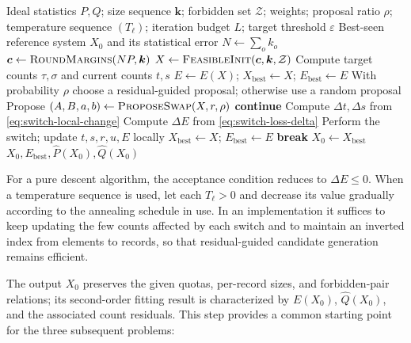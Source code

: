 \documentclass[11pt,a4paper]{article}
\numberwithin{equation}{section}
\theoremstyle{definition}
\numberwithin{algorithm}{section}
\begin{document}
\begin{algorithm}[H]
\small
\caption{Feasible initialization and residual-guided second-order statistical fitting}
\label{alg:baseline}
\begin{algorithmic}[1]
\Require Ideal statistics $P,Q$; size sequence $\boldsymbol k$;
forbidden set $\mathcal Z$; weights; proposal ratio $\rho$;
temperature sequence $(T_\ell)$; iteration budget $L$; target threshold $\varepsilon$
\Ensure Best-seen reference system $X_0$ and its statistical error
\State $N\gets\sum_o k_o$
\State $\boldsymbol c\gets\Call{RoundMargins}{NP,\boldsymbol k}$
\State $X\gets\Call{FeasibleInit}{\boldsymbol c,\boldsymbol k,\mathcal Z}$
\State Compute target counts $\tau,\sigma$ and current counts $t,s$
\State $E\gets E(X)$; $X_{\mathrm{best}}\gets X$;
       $E_{\mathrm{best}}\gets E$
  \State With probability $\rho$ choose a residual-guided proposal; otherwise use a random proposal
  \State Propose $(A,B,a,b)\gets\Call{ProposeSwap}{X,r,\rho}$
    \State \textbf{continue}
  \EndIf
  \State Compute $\Delta t,\Delta s$ from \eqref{eq:switch-local-change}
  \State Compute $\Delta E$ from \eqref{eq:switch-loss-delta}
    \State Perform the switch; update $t,s,r,u,E$ locally
      \State $X_{\mathrm{best}}\gets X$;
             $E_{\mathrm{best}}\gets E$
    \EndIf
  \EndIf
    \State \textbf{break}
  \EndIf
\EndFor
\State $X_0\gets X_{\mathrm{best}}$
\State \Return $X_0,E_{\mathrm{best}},\widehat P(X_0),\widehat Q(X_0)$
\end{algorithmic}
\end{algorithm}

For a pure descent algorithm, the acceptance condition reduces to $\Delta E\le0$.
When a temperature sequence is used, let each $T_\ell>0$ and decrease its value gradually
according to the annealing schedule in use.
In an implementation it suffices to keep updating the few counts affected by each switch and
to maintain an inverted index from elements to records, so that residual-guided candidate
generation remains efficient.

The output $X_0$ preserves the given quotas, per-record sizes, and forbidden-pair relations;
its second-order fitting result is characterized by $E(X_0)$, $\widehat Q(X_0)$, and the
associated count residuals.
This step provides a common starting point for the three subsequent problems:
\end{document}
